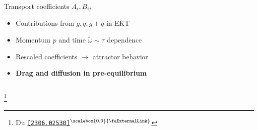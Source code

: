 \documentclass[aspectratio=169,11pt,usenames,dvipsnames]{beamer}
\renewcommand{\thefootnote}{\color{customblue}\faPaperPlaneO}
\newcommand\blfootnote[1]{%
  \begingroup
  \renewcommand\thefootnote{}\footnote{#1}%
  \addtocounter{footnote}{-1}%
  \endgroup
}
\begin{document}
\begin{frame}[t,noframenumbering]
\begin{columns}[onlytextwidth,t]
        \begin{center}
            {\Large\color{isgold} Transport coefficients $A_i, B_{ij}$\\[10pt]}
            \footnotesize
                \begin{itemize}
                    \item {\color{lightgray}Contributions from $g, q, g+q$ in EKT}
                    \item {\color{lightgray}Momentum $p$ and time $\widetilde{\omega}\sim\tau$ dependence}
                    \item {\color{lightgray}Rescaled coefficients $\rightarrow$ attractor behavior}\\[15pt]
                    \item {\color{destacado}\bfseries\normalsize{Drag and diffusion in pre-equilibrium}}
                \end{itemize}
        \end{center}
    \end{columns}
    \blfootnote{\scriptsize Du \href{https://arxiv.org/abs/2306.02530}{{\color{isgold}\texttt{[2306.02530]}$^\text{\scalebox{0.9}{\faExternalLink}}$}}}
\end{frame}

\end{document}
